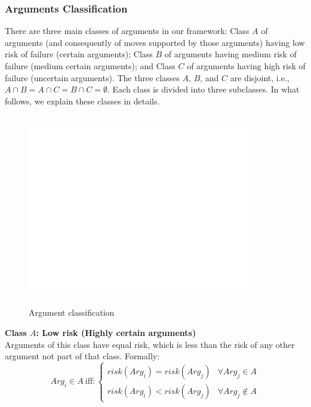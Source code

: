 \subsubsection{Arguments Classification}\label{sec:classification}
There are three main classes of arguments in our framework: Class $A$ of arguments (and consequently of moves supported by those
arguments) having low risk of failure (certain arguments); Class $B$ of arguments having medium risk of failure (medium certain arguments);
and Class $C$ of arguments having high risk of failure (uncertain arguments). The three classes $A$, $B$, and $C$ are disjoint, i.e.,
$A \cap B = A \cap C = B \cap C = \emptyset$. Each class is divided into three subclasses. In what follows, we explain these classes in details.\\

\begin{figure}
                \begin{center}
                \includegraphics[width=10cm,
                height=8cm]{Figures/argumentclass.eps}\label{ClassificationFigure}
                \caption{Argument classification}
                \end{center}
\end{figure}

\textbf{Class $A$: Low risk (Highly certain arguments)}\\
Arguments of this class have equal risk, which is less than the risk of any other argument not part of that class. Formally:
\begin{equation}
Arg_i \in  A~ \text{iff}:
\begin{cases}
risk(Arg_i) = risk (Arg_j) & \forall Arg_j \in A
\\
risk(Arg_i) < risk(Arg_j)  & \forall Arg_j \notin A
\end{cases}
\end{equation}


